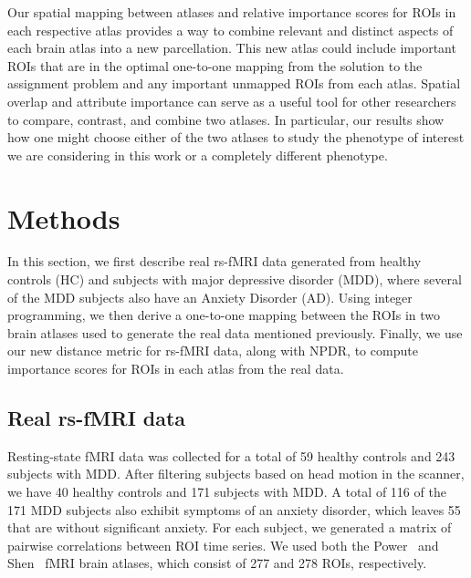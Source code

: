 \documentclass[10pt,letterpaper]{article}\usepackage[]{graphicx}\usepackage[]{color}
\begin{document}
Our spatial mapping between atlases and relative importance scores for ROIs in each respective atlas provides a way to combine relevant and distinct aspects of each brain atlas into a new parcellation. This new atlas could include important ROIs that are in the optimal one-to-one mapping from the solution to the assignment problem and any important unmapped ROIs from each atlas. Spatial overlap and attribute importance can serve as a useful tool for other researchers to compare, contrast, and combine two atlases. In particular, our results show how one might choose either of the two atlases to study the phenotype of interest we are considering in this work or a completely different phenotype.

\section{Methods}
In this section, we first describe real rs-fMRI data generated from healthy controls (HC) and subjects with major depressive disorder (MDD), where several of the MDD subjects also have an Anxiety Disorder (AD). Using integer programming, we then derive a one-to-one mapping between the ROIs in two brain atlases used to generate the real data mentioned previously. Finally, we use our new distance metric for rs-fMRI data, along with NPDR, to compute importance scores for ROIs in each atlas from the real data.

\subsection{Real rs-fMRI data}
%

Resting-state fMRI data was collected for a total of 59 healthy controls and 243 subjects with MDD. After filtering subjects based on head motion in the scanner, we have 40 healthy controls and 171 subjects with MDD. A total of 116 of the 171 MDD subjects also exhibit symptoms of an anxiety disorder, which leaves 55 that are without significant anxiety. For each subject, we generated a matrix of pairwise correlations between ROI time series. We used both the Power~\cite{power2011} and Shen~\cite{shen2013} fMRI brain atlases, which consist of 277 and 278 ROIs, respectively. 
\end{document}

